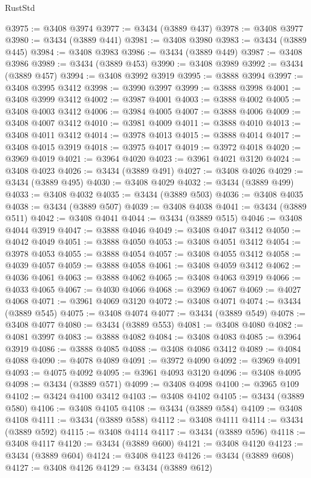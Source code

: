 \begin{lexlean}{RustStd}
\begin{coremodule}
@3975 := @3408 @3974
@3977 := @3434 (@3889 @437)
@3978 := @3408 @3977
@3980 := @3434 (@3889 @441)
@3981 := @3408 @3980
@3983 := @3434 (@3889 @445)
@3984 := @3408 @3983
@3986 := @3434 (@3889 @449)
@3987 := @3408 @3986
@3989 := @3434 (@3889 @453)
@3990 := @3408 @3989
@3992 := @3434 (@3889 @457)
@3994 := @3408 @3992 @3919
@3995 := @3888 @3994
@3997 := @3408 @3995 @3412
@3998 := @3990 @3997
@3999 := @3888 @3998
@4001 := @3408 @3999 @3412
@4002 := @3987 @4001
@4003 := @3888 @4002
@4005 := @3408 @4003 @3412
@4006 := @3984 @4005
@4007 := @3888 @4006
@4009 := @3408 @4007 @3412
@4010 := @3981 @4009
@4011 := @3888 @4010
@4013 := @3408 @4011 @3412
@4014 := @3978 @4013
@4015 := @3888 @4014
@4017 := @3408 @4015 @3919
@4018 := @3975 @4017
@4019 := @3972 @4018
@4020 := @3969 @4019
@4021 := @3964 @4020
@4023 := @3961 @4021 @3120
@4024 := @3408 @4023
@4026 := @3434 (@3889 @491)
@4027 := @3408 @4026
@4029 := @3434 (@3889 @495)
@4030 := @3408 @4029
@4032 := @3434 (@3889 @499)
@4033 := @3408 @4032
@4035 := @3434 (@3889 @503)
@4036 := @3408 @4035
@4038 := @3434 (@3889 @507)
@4039 := @3408 @4038
@4041 := @3434 (@3889 @511)
@4042 := @3408 @4041
@4044 := @3434 (@3889 @515)
@4046 := @3408 @4044 @3919
@4047 := @3888 @4046
@4049 := @3408 @4047 @3412
@4050 := @4042 @4049
@4051 := @3888 @4050
@4053 := @3408 @4051 @3412
@4054 := @3978 @4053
@4055 := @3888 @4054
@4057 := @3408 @4055 @3412
@4058 := @4039 @4057
@4059 := @3888 @4058
@4061 := @3408 @4059 @3412
@4062 := @4036 @4061
@4063 := @3888 @4062
@4065 := @3408 @4063 @3919
@4066 := @4033 @4065
@4067 := @4030 @4066
@4068 := @3969 @4067
@4069 := @4027 @4068
@4071 := @3961 @4069 @3120
@4072 := @3408 @4071
@4074 := @3434 (@3889 @545)
@4075 := @3408 @4074
@4077 := @3434 (@3889 @549)
@4078 := @3408 @4077
@4080 := @3434 (@3889 @553)
@4081 := @3408 @4080
@4082 := @4081 @3997
@4083 := @3888 @4082
@4084 := @3408 @4083
@4085 := @3964 @3919
@4086 := @3888 @4085
@4088 := @3408 @4086 @3412
@4089 := @4084 @4088
@4090 := @4078 @4089
@4091 := @3972 @4090
@4092 := @3969 @4091
@4093 := @4075 @4092
@4095 := @3961 @4093 @3120
@4096 := @3408 @4095
@4098 := @3434 (@3889 @571)
@4099 := @3408 @4098
@4100 := @3965 @109
@4102 := @3424 @4100 @3412
@4103 := @3408 @4102
@4105 := @3434 (@3889 @580)
@4106 := @3408 @4105
@4108 := @3434 (@3889 @584)
@4109 := @3408 @4108
@4111 := @3434 (@3889 @588)
@4112 := @3408 @4111
@4114 := @3434 (@3889 @592)
@4115 := @3408 @4114
@4117 := @3434 (@3889 @596)
@4118 := @3408 @4117
@4120 := @3434 (@3889 @600)
@4121 := @3408 @4120
@4123 := @3434 (@3889 @604)
@4124 := @3408 @4123
@4126 := @3434 (@3889 @608)
@4127 := @3408 @4126
@4129 := @3434 (@3889 @612)

\end{coremodule}
\end{lexlean}
